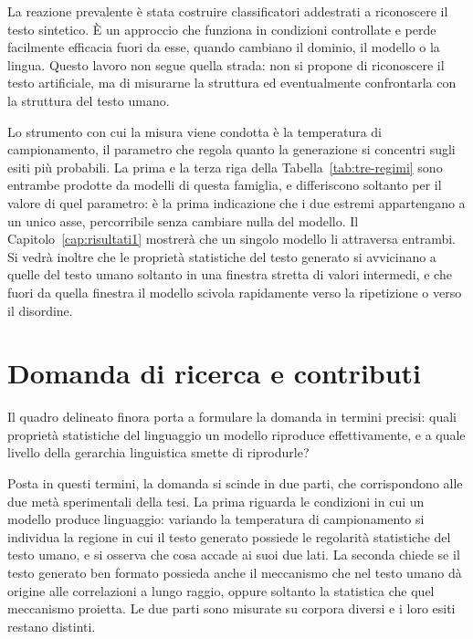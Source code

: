 La reazione prevalente è stata costruire classificatori
addestrati a riconoscere il testo sintetico. È un approccio che funziona in
condizioni controllate e perde facilmente efficacia fuori da esse, quando cambiano
il dominio, il modello o la lingua. Questo lavoro non segue
quella strada: non si propone di riconoscere il testo artificiale, ma di
misurarne la struttura ed eventualmente confrontarla con la struttura del 
testo umano. 

Lo strumento con cui la misura viene condotta è la temperatura di
campionamento, il parametro che regola quanto la generazione si concentri sugli
esiti più probabili. La prima e la terza riga della
Tabella~\ref{tab:tre-regimi} sono entrambe prodotte da modelli di questa
famiglia, e differiscono soltanto per il valore di quel parametro: è la prima
indicazione che i due estremi appartengano a un unico asse, percorribile senza
cambiare nulla del modello. Il Capitolo~\ref{cap:risultati1} mostrerà che un
singolo modello li attraversa entrambi. Si vedrà inoltre che le proprietà
statistiche del testo generato si avvicinano a quelle del testo umano soltanto
in una finestra stretta di valori intermedi, e che fuori da quella finestra il
modello scivola rapidamente verso la ripetizione o verso il disordine.

\section{Domanda di ricerca e contributi}
\label{sec:intro-domanda}

Il quadro delineato finora porta a formulare la domanda in termini precisi:
quali proprietà statistiche del linguaggio un modello riproduce effettivamente,
e a quale livello della gerarchia linguistica smette di riprodurle?

Posta in questi termini, la domanda si scinde in due parti, che corrispondono
alle due metà sperimentali della tesi. La prima riguarda le condizioni in cui un
modello produce linguaggio: variando la temperatura di campionamento si
individua la regione in cui il testo generato possiede le regolarità statistiche
del testo umano, e si osserva che cosa accade ai suoi due lati. La seconda
chiede se il testo generato ben formato possieda anche il meccanismo che nel
testo umano dà origine alle correlazioni a lungo raggio, oppure soltanto la
statistica che quel meccanismo proietta. Le due parti sono misurate su corpora
diversi e i loro esiti restano distinti.


